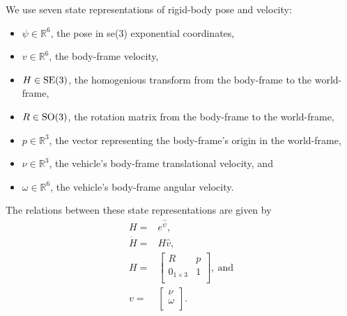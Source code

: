 \noindent We use seven state representations of rigid-body pose and velocity:
\begin{itemize}
\item $\psi\in\mathbb{R}^6$, the pose in se(3) exponential
coordinates,
\item $v\in\mathbb{R}^6$, the body-frame velocity,   
\item $H\in\SE3$, the homogenious transform from the body-frame to the world-frame,
\item $R\in\SO3$, the rotation matrix from the body-frame to the
  world-frame,
\item $p\in\mathbb{R}^3$, the vector representing the body-frame's
  origin in the world-frame,
\item $\nu\in\mathbb{R}^3$, the vehicle's body-frame translational
  velocity, and
\item $\omega\in\mathbb{R}^6$, the vehicle's body-frame angular
  velocity.
\end{itemize} 
%
%
The relations between these state representations are given by
%
\begin{align}
H=&e^{\widehat{\psi}}, \\
\dot{H}=&H\widehat{v}, \\
H=&\left[ \begin{array}{cc}
         R      & p  \\
    0_{1 \times 3}  & 1  \\
  \end{array} \right],~\text{and} \\
v=&\left[ \begin{array}{c} \nu \\  \omega \\ \end{array} \right].
\end{align}

